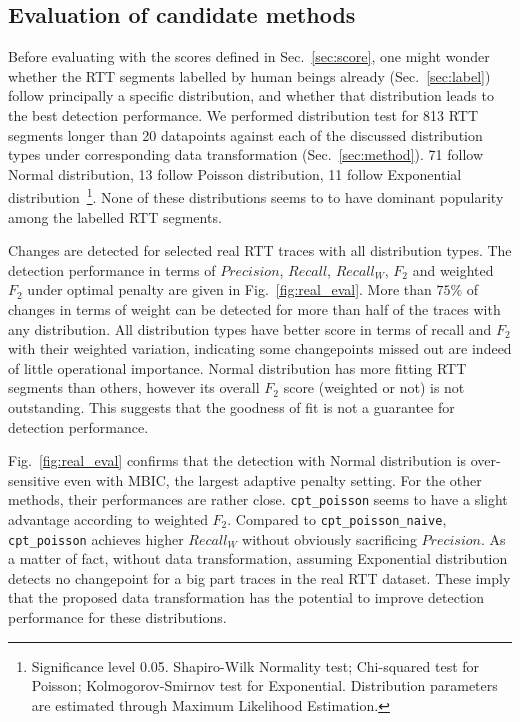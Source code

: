 \subsection{Evaluation of candidate methods}
\label{sec:eval}

Before evaluating with the scores defined in Sec.~\ref{sec:score}, one might wonder whether the RTT segments labelled by human beings already (Sec.~\ref{sec:label}) follow principally a specific distribution, and whether that distribution leads to the best detection performance.
We performed distribution test for 813 RTT segments longer than 20 datapoints against each of the discussed distribution types under corresponding data transformation (Sec.~\ref{sec:method}). 71 follow Normal distribution, 13 follow Poisson distribution, 
11 follow Exponential distribution~\footnote{Significance level 0.05. Shapiro-Wilk Normality test; %
Chi-squared test for Poisson; Kolmogorov-Smirnov test for Exponential. Distribution parameters are estimated through Maximum Likelihood Estimation.}. None of these distributions seems to to have dominant popularity among the labelled RTT segments.

Changes are detected for selected real RTT traces with all distribution types.
The detection performance in terms of $Precision$, $Recall$, $Recall_W$, $F_2$ and weighted $F_2$ under optimal penalty are given in Fig.~\ref{fig:real_eval}.
More than $75\%$ of changes in terms of weight can be detected for more than half of the traces with any distribution.
All distribution types have better score in terms of recall and $F_2$ with their weighted variation, indicating some changepoints missed out are indeed of little operational importance.
Normal distribution has more fitting RTT segments than others, however its overall $F_2$ score (weighted or not) is not outstanding. This suggests that the goodness of fit is not a guarantee for detection performance.

Fig.~\ref{fig:real_eval} confirms that the detection with Normal distribution is over-sensitive even with MBIC, the largest adaptive penalty setting. For the other methods, their performances are rather close. 
\texttt{cpt\_poisson} seems to have a slight advantage according to weighted $F_2$.
Compared to \texttt{cpt\_poisson\_naive}, \texttt{cpt\_poisson} achieves higher $Recall_W$ without obviously sacrificing $Precision$.
As a matter of fact, without data transformation, assuming Exponential distribution detects no changepoint for a big part traces in the real RTT dataset.
These imply that the proposed data transformation has the potential to improve detection performance for these distributions. 

